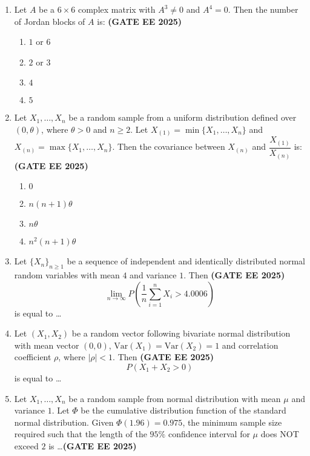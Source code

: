 \documentclass[journal,12pt,onecolumn]{IEEEtran}
\theoremstyle{remark}
\begin{document}
\begin{enumerate}
\item Let $A$ be a $6 \times 6$ complex matrix with $A^3 \neq 0$ and $A^4 = 0$. Then the number of Jordan blocks of $A$ is:  \hfill \textbf{(GATE EE 2025)}\\
\begin{enumerate} 
    \item $1$ or $6$
    \item $2$ or $3$
    \item $4$
    \item $5$
\end{enumerate}

\item Let $X_1, \ldots, X_n$ be a random sample from a uniform distribution defined over $(0,\theta)$, where $\theta > 0$ and $n \geq 2$. Let $X_{(1)} = \min\{X_1,\ldots,X_n\}$ and $X_{(n)} = \max\{X_1,\ldots,X_n\}$. Then the covariance between $X_{(n)}$ and $\dfrac{X_{(1)}}{X_{(n)}}$ is:  \hfill \textbf{(GATE EE 2025)}\\
\begin{enumerate} 
    \item $0$
    \item $n(n+1)\theta$
    \item $n\theta$
    \item $n^2(n+1)\theta$
\end{enumerate}

\setlength{\parskip}{6pt}
\setlength{\parindent}{0pt}


\item Let $\{X_n\}_{n \geq 1}$ be a sequence of independent and identically distributed normal random variables with mean $4$ and variance $1$. Then  \hfill \textbf{(GATE EE 2025)}\\
\[
\lim_{n \to \infty} P\left( \frac{1}{n} \sum_{i=1}^n X_i > 4.0006 \right) 
\]
is equal to \dots

\item Let $(X_1, X_2)$ be a random vector following bivariate normal distribution with mean vector $(0,0)$, $\mathrm{Var}(X_1)=\mathrm{Var}(X_2)=1$ and correlation coefficient $\rho$, where $|\rho| < 1$. Then \hfill \textbf{(GATE EE 2025)}\\
\[
P(X_1 + X_2 > 0) 
\]
is equal to \dots

\item Let $X_1,\dots,X_n$ be a random sample from normal distribution with mean $\mu$ and variance $1$. Let $\Phi$ be the cumulative distribution function of the standard normal distribution. Given $\Phi(1.96) = 0.975$, the minimum sample size required such that the length of the $95\%$ confidence interval for $\mu$ does NOT exceed $2$ is \dots  \hfill \textbf{(GATE EE 2025)}\\


\end{enumerate}
\end{document}
